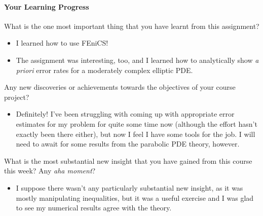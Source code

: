 \vfill

\paragraph*{Your Learning Progress}%

What is the one most important thing that you have learnt from this assignment?

\vspace*{3mm}

\begin{itemize}
\item I learned how to use \textsf{FEniCS}!
\item The assignment was interesting, too, and I learned how to analytically show \textit{a priori} error rates for a moderately complex elliptic PDE.
\end{itemize}

\vspace*{3mm}

Any new discoveries or achievements towards the objectives of your course project?

\begin{itemize}
\item Definitely! I've been struggling with coming up with appropriate error estimates for my problem for quite some time now (although the effort hasn't exactly been there either), but now I feel I have some tools for the job.
I will need to await for some results from the parabolic PDE theory, however.
\end{itemize}

\vspace*{3mm}

What is the most substantial new insight that you have gained from this course this week? Any \emph{aha moment}?

\begin{itemize}
\item I suppose there wasn't any particularly substantial new insight, as it was mostly manipulating inequalities, but it was a useful exercise and I was glad to see my numerical results agree with the theory.
\end{itemize}


